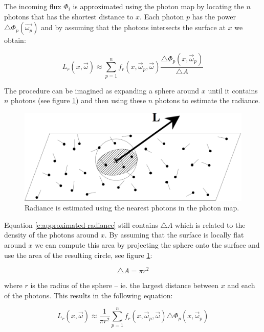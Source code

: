 The incoming flux $\Phi_i$ is approximated using the photon map by locating the $n$ photons that has the shortest distance to $x$. Each photon $p$ has the power $\triangle\Phi_p(\vec{\omega_p})$ and by assuming that the photons intersects the surface at $x$ we obtain:

\begin{equation}\label{e:approximated-radiance}
	L_r(x,\vec{\omega})\approx \sum^{n}_{p=1}f_r(x,\vec{\omega}_p,\vec{\omega})\frac{\triangle\Phi_p(x,\vec{\omega}_p)}{\triangle A}
\end{equation}

The procedure can be imagined as expanding a sphere around $x$ until it contains $n$ photons (see figure \ref{f:sphere-estimate}) and then using these $n$ photons to estimate the radiance.

\begin{figure}
\sidecaption
	\includegraphics[width=.65\textwidth]{graphics/pm/pm-6}
	\caption{Radiance is estimated using the nearest photons in the photon map.}
	\label{f:sphere-estimate}
\end{figure}

Equation \ref{e:approximated-radiance} still contains $\triangle A$ which is related to the density of the photons around $x$. By assuming that the surface is locally flat around $x$ we can compute this area by projecting the sphere onto the surface and use the area of the resulting circle, see figure \ref{f:sphere-estimate}:

\begin{equation*}
	\triangle A=\pi r^{2}
\end{equation*}

where $r$ is the radius of the sphere -- ie. the largest distance between $x$ and each of the photons. This results in the following equation:

\begin{equation}\label{e:approximated-radiance-area}
	L_r(x,\vec{\omega})\approx \frac{1}{\pi r^{2}}\sum^{n}_{p=1}f_r(x,\vec{\omega}_p,\vec{\omega})\triangle\Phi_p(x,\vec{\omega}_p)
\end{equation}

